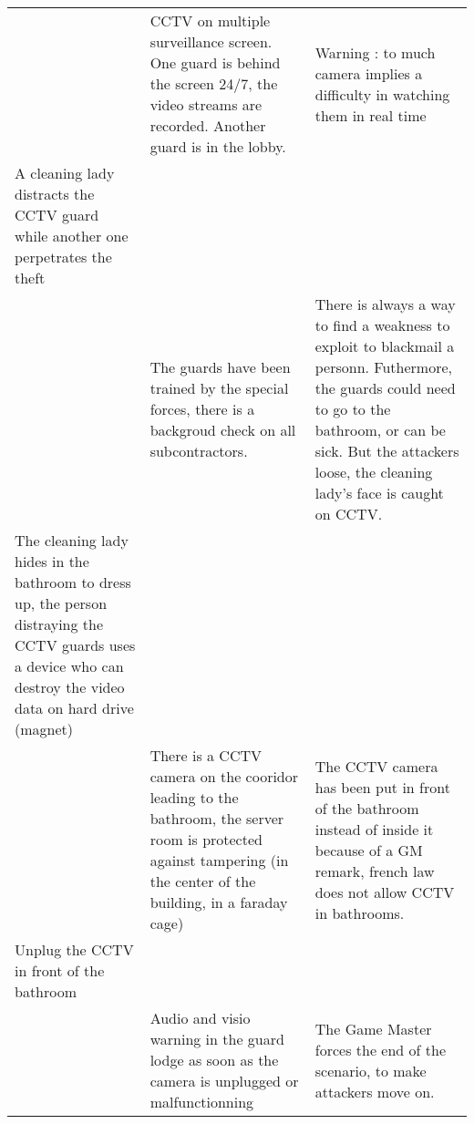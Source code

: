 \documentclass[11pt]{article} %
\begin{document}
\begin{longtable}{|p{4cm}|p{4cm}|p{4cm}|}
& CCTV on multiple surveillance screen. One guard is behind the screen 24/7,
the video streams are recorded. Another guard is in the lobby. & 
Warning : to much camera implies a difficulty in watching them in real time \\
A cleaning lady distracts the CCTV guard while another one perpetrates the theft && \\
& The guards have been trained by the special forces, there is a backgroud check on all
subcontractors. & There is always a way to find a weakness to exploit to blackmail a personn. 
Futhermore, the guards could need to go to the bathroom, or can be sick. But the attackers loose, 
the cleaning lady's face is caught on CCTV. \\
The cleaning lady hides in the bathroom to dress up, the person distraying the CCTV guards 
uses a device who can destroy the video data on hard drive (magnet) && \\
& There is a CCTV camera on the cooridor leading to the bathroom, the server room is
protected against tampering (in the center of the building, in a faraday cage) &
The CCTV camera has been put in front of the bathroom instead of inside it because 
of a GM remark, french law does not allow CCTV in bathrooms. \\
Unplug the CCTV in front of the bathroom & & \\
& Audio and visio warning in the guard lodge as soon as the camera is unplugged 
or malfunctionning & The Game Master forces the end of the scenario, to make attackers 
move on. \\
\end{longtable}
\end{document}
